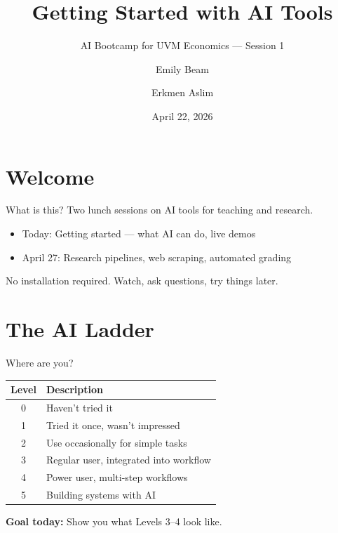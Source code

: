 \documentclass[aspectratio=169]{beamer}
\title{Getting Started with AI Tools}
\subtitle{AI Bootcamp for UVM Economics --- Session 1}
\author{Emily Beam \and Erkmen Aslim}
\date{April 22, 2026}
\institute{Department of Economics, University of Vermont}
\begin{document}
\maketitle

\section{Welcome}

\begin{frame}{What is this?}
Two lunch sessions on AI tools for teaching and research.

\bigskip

\begin{itemize}
    \item Today: Getting started --- what AI can do, live demos
    \item April 27: Research pipelines, web scraping, automated grading
\end{itemize}

\bigskip
No installation required. Watch, ask questions, try things later.
\end{frame}

\section{The AI Ladder}

\begin{frame}{Where are you?}
\begin{table}
\begin{tabular}{cl}
\toprule
Level & Description \\
\midrule
0 & Haven't tried it \\
1 & Tried it once, wasn't impressed \\
2 & Use occasionally for simple tasks \\
3 & Regular user, integrated into workflow \\
4 & Power user, multi-step workflows \\
5 & Building systems with AI \\
\bottomrule
\end{tabular}
\end{table}

\bigskip
\textbf{Goal today:} Show you what Levels 3--4 look like.
\end{frame}
\end{document}
